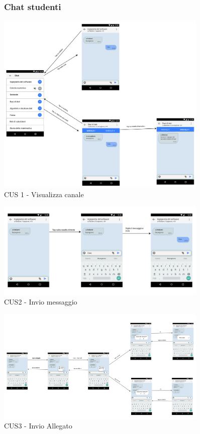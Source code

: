 \begin{figure}
	\subsubsection{Chat studenti}
	\centering
	\includegraphics[width=0.9\textwidth]{imgs/gruppo6/activities/act_cus1_visualizza_canale.pdf}
	\caption{CUS 1 - Visualizza canale}
	\label{fig:act-cus1}
\end{figure}

\begin{figure}
	\centering
	\includegraphics[width=0.9\textwidth]{imgs/gruppo6/activities/act_cus2_invio_messaggio.pdf}
	\caption{CUS2 - Invio messaggio}
	\label{fig:act-cus2}
\end{figure}

\begin{figure}
	\centering
	\includegraphics[width=0.9\textwidth]{imgs/gruppo6/activities/act_cus3_invia_allegato.pdf}
	\caption{CUS3 - Invio Allegato}
	\label{fig:act-cus3-1}
\end{figure}


